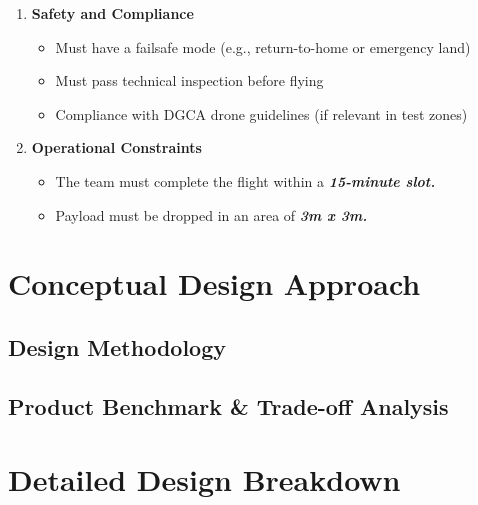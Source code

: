 \documentclass[12pt]{report}
\begin{document}
\begin{enumerate}
\begin{itemize}
        \end{itemize}
      \item \textbf{Safety and Compliance}
        \begin{itemize}
          \item Must have a failsafe mode (e.g., return-to-home or emergency land)
          \item Must pass technical inspection before flying
          \item Compliance with DGCA drone guidelines (if relevant in test zones)
        \end{itemize}
      \item \textbf{Operational Constraints}
        \begin{itemize}
          \item The team must complete the flight within a \textbf{\textit{15-minute slot.}}
          \item Payload must be dropped in an area of \textbf{\textit{3m x 3m.}}
        \end{itemize}
    \end{enumerate}
  \chapter{Conceptual Design Approach}
    \section{Design Methodology}
    \section{Product Benchmark \& Trade-off Analysis} %
                                                 
  \chapter{Detailed Design Breakdown}                                 
\end{document}
